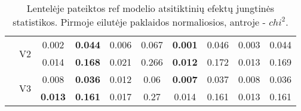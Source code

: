 \documentclass[12pt,a4paper]{article}
\begin{document}
\begin{sidewaystable}[ht]
{\begin{tabular}{cc|cc|cc|cc|cc|}
   & \multirow{2}{*}{V2} & 0.002 & \textbf{0.044} & 0.006 & 0.067 & \textbf{0.001} & 0.046 & 0.003 & 0.044 \\ 
   &  & 0.014 & \textbf{0.168} & 0.021 & 0.266 & \textbf{0.012} & 0.172 & 0.013 & 0.169 \\ 
   & \multirow{2}{*}{V3} & 0.008 & \textbf{0.036} & 0.012 & 0.06 & \textbf{0.007} & 0.037 & 0.008 & 0.036 \\ 
   &  & \textbf{0.013} & \textbf{0.161} & 0.017 & 0.27 & 0.014 & 0.161 & 0.013 & 0.161 \\ 
   \hline
\end{tabular}
}
\caption{Lentelėje pateiktos ref modelio atsitiktinių efektų jungtinės statistikos. Pirmoje eilutėje paklaidos normaliosios, antroje - $chi^2$.}
\end{sidewaystable}
\end{document}
